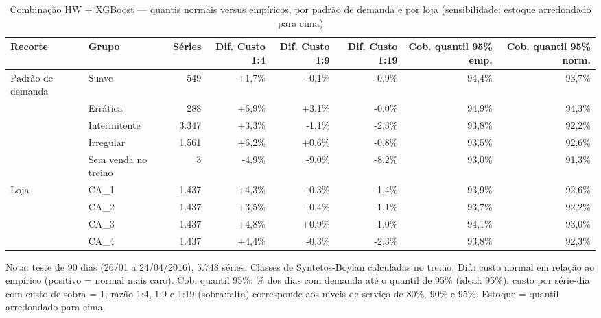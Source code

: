 \begin{table}[htbp]
\centering
\small
\caption{Combinação HW + XGBoost — quantis normais versus empíricos, por padrão de demanda e por loja (sensibilidade: estoque arredondado para cima)}
\label{tab:comb_empirico_vs_normal_por_grupo_sensibilidade}
\begin{tabular}{llrrrrrr}
\toprule
Recorte & Grupo & Séries & Dif. Custo 1:4 & Dif. Custo 1:9 & Dif. Custo 1:19 & Cob. quantil 95\% emp. & Cob. quantil 95\% norm. \\
\midrule
Padrão de demanda & Suave & 549 & +1,7\% & -0,1\% & -0,9\% & 94,4\% & 93,7\% \\
 & Errática & 288 & +6,9\% & +3,1\% & -0,0\% & 94,9\% & 94,3\% \\
 & Intermitente & 3.347 & +3,3\% & -1,1\% & -2,3\% & 93,8\% & 92,2\% \\
 & Irregular & 1.561 & +6,2\% & +0,6\% & -0,8\% & 93,5\% & 92,6\% \\
 & Sem venda no treino & 3 & -4,9\% & -9,0\% & -8,2\% & 93,0\% & 91,3\% \\
\addlinespace
Loja & CA\_1 & 1.437 & +4,3\% & -0,3\% & -1,4\% & 93,9\% & 92,6\% \\
 & CA\_2 & 1.437 & +3,5\% & -0,4\% & -1,1\% & 93,7\% & 92,2\% \\
 & CA\_3 & 1.437 & +4,8\% & +0,9\% & -1,0\% & 94,1\% & 93,0\% \\
 & CA\_4 & 1.437 & +4,4\% & -0,3\% & -2,3\% & 93,8\% & 92,3\% \\
\bottomrule
\end{tabular}
\par\smallskip
{\footnotesize Nota: teste de 90 dias (26/01 a 24/04/2016), 5.748 séries. Classes de Syntetos-Boylan calculadas no treino. Dif.: custo normal em relação ao empírico (positivo = normal mais caro). Cob. quantil 95\%: \% dos dias com demanda até o quantil de 95\% (ideal: 95\%). custo por série-dia com custo de sobra = 1; razão 1:4, 1:9 e 1:19 (sobra:falta) corresponde aos níveis de serviço de 80\%, 90\% e 95\%. Estoque = quantil arredondado para cima.}
\end{table}
